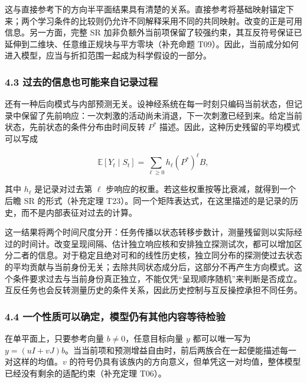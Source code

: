 \documentclass[11pt,a4paper]{article}
\begin{document}
这与直接参考下的方向半平面结果具有清楚的关系。直接参考将基础映射锚定下来；两个学习条件的比较则仍允许不同解释采用不同的共同映射。改变的正是可用信息。另一方面，完整
SR
加非负额外当前项保留了较强约束，其互反符号保证已延伸到二维块、任意维正规块与平方零块（补充命题
T09）。因此，当前成分如何进入模型，应当与折扣范围一起成为科学假设的一部分。

\subsubsection{4.3
过去的信息也可能来自记录过程}\label{ux8fc7ux53bbux7684ux4fe1ux606fux4e5fux53efux80fdux6765ux81eaux8bb0ux5f55ux8fc7ux7a0b}

\par
\noindent\begin{minipage}{\linewidth}

还有一种后向模式与内部预测无关。设神经系统在每一时刻只编码当前状态，但记录中保留了先前响应：一次刺激的活动尚未消退，下一次刺激已经到来。给定当前状态，先前状态的条件分布由时间反转
\(P^*\) 描述。因此，这种历史残留的平均模式可以写成

\[
\mathbb E[Y_t\mid S_t]
=\sum_{\ell\geq0}h_\ell(P^*)^\ell B,
\]

\end{minipage}\par

其中 \(h_\ell\) 是记录对过去第 \(\ell\)
步响应的权重。若这些权重按等比衰减，就得到一个后瞻 SR 的形式（补充定理
T23）。同一个矩阵表达式，在这里描述的是记录的历史，而不是内部表征对过去的计算。

这一结果将两个时间尺度分开：任务传播以状态转移步数计，测量残留则以实际经过的时间计。改变呈现间隔、估计独立响应核和安排独立探测试次，都可以增加区分二者的信息。对于稳定且绝对可和的线性历史核，独立同分布的探测使过去状态的平均贡献与当前身份无关；去除共同状态成分后，这部分不再产生方向模式。这个条件要求过去与当前身份真正独立，不能仅凭“呈现顺序随机”来判断是否成立。互反任务也会反转测量历史的条件关系，因此历史控制与互反操控承担不同任务。

\subsubsection{4.4
一个性质可以确定，模型仍有其他内容等待检验}\label{ux4e00ux4e2aux6027ux8d28ux53efux4ee5ux786eux5b9aux6a21ux578bux4ecdux6709ux5176ux4ed6ux5185ux5bb9ux7b49ux5f85ux68c0ux9a8c}

在单平面上，只要参考向量 \(b\neq0\)，任意目标向量 \(y\) 都可以唯一写为
\(y=(uI+vJ)b\)。当当前项和预测增益自由时，前后两族合在一起便能描述每一对这样的均值。\(v\)
的符号仍具有该族内的方向意义，但单凭这一对均值，整体模型已经没有剩余的适配约束（补充定理
T06）。
\end{document}
